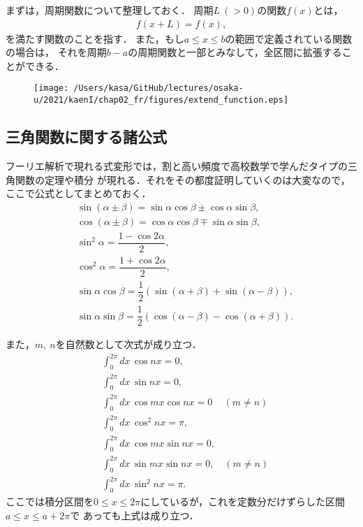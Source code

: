 まずは，周期関数について整理しておく．
周期$L~(>0)$の関数$f(x)$とは，
\begin{align}
  f\left(x + L\right) = f\left(x\right), 
\end{align}
を満たす関数のことを指す．
また，もし$a\leq x \leq b$の範囲で定義されている関数の場合は，
それを周期$b-a$の周期関数と一部とみなして，全区間に拡張することができる．
%
\begin{figure}[htbp]
  \texttt{[image: /Users/kasa/GitHub/lectures/osaka-u/2021/kaenI/chap02\_fr/figures/extend\_function.eps]} 
\end{figure}
%
\subsection{三角関数に関する諸公式}
%
フーリエ解析で現れる式変形では，割と高い頻度で高校数学で学んだタイプの三角関数の定理や積分
が現れる．それをその都度証明していくのは大変なので，ここで公式としてまとめておく．
\begin{align}
 &\sin\left(\alpha \pm \beta\right) = \sin\alpha \cos \beta \pm \cos\alpha \sin\beta, \\
 &\cos\left(\alpha \pm \beta\right) = \cos\alpha \cos \beta \mp \sin\alpha \sin\beta, \\
 &\sin^{2} \alpha = \dfrac{1-\cos 2\alpha}{2}, \\
 &\cos^{2} \alpha = \dfrac{1+\cos 2\alpha}{2}, \\
 &\sin \alpha \cos \beta = \dfrac{1}{2}\left(\sin(\alpha+\beta)+\sin\left(\alpha -\beta\right)\right), \label{tri_formula_01} \\
 &\sin \alpha \sin \beta = \dfrac{1}{2}\left(\cos(\alpha-\beta) - \cos(\alpha+\beta)\right). \label{tri_formula_02} 
\end{align}

また，$m,~n$を自然数として次式が成り立つ．
\begin{align}
 &\int_{0}^{2\pi}dx\,\cos nx = 0,  \label{tri_intformula_01} \\
 &\int_{0}^{2\pi}dx\,\sin nx = 0,  \label{tri_intformula_02} \\
 &\int_{0}^{2\pi}dx\,\cos mx \cos nx = 0\, \quad (m\neq n) \label{tri_intformula_03} \\
 &\int_{0}^{2\pi}dx\,\cos^{2} nx = \pi, \label{tri_intformula_04} \\
 &\int_{0}^{2\pi}dx\,\cos mx \sin nx = 0, \label{tri_intformula_05} \\
 &\int_{0}^{2\pi}dx\,\sin mx \sin nx = 0, \quad (m\neq n) \label{tri_intformula_06} \\
 &\int_{0}^{2\pi}dx\,\sin^{2} nx = \pi. \label{tri_intformula_07}
\end{align}
ここでは積分区間を$0\leq x \leq 2\pi$にしているが，これを定数分だけずらした区間$a\leq x \leq a + 2\pi$で
あっても上式は成り立つ．
%
